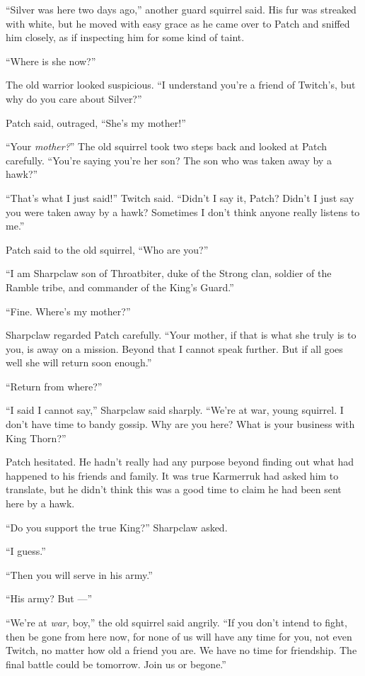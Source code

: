 \documentclass[12pt]{memoir}
\begin{document}
“Silver was here two days ago,” another guard squirrel said. His fur
was streaked with white, but he moved with easy grace as he came over
to Patch and sniffed him closely, as if inspecting him for some kind
of taint.

“Where is she now?”

The old warrior looked suspicious. “I understand you’re a friend of
Twitch’s, but why do you care about Silver?”

Patch said, outraged, “She’s my mother!”

“Your \textit{mother?}” The old squirrel took two steps back and
looked at Patch carefully. “You’re saying you’re her son? The son who
was taken away by a hawk?”

“That’s what I just said!” Twitch said. “Didn’t I say it, Patch?
Didn’t I just say you were taken away by a hawk? Sometimes I don’t
think anyone really listens to me.”

Patch said to the old squirrel, “Who are you?”

“I am Sharpclaw son of Throatbiter, duke of the Strong clan, soldier
of the Ramble tribe, and commander of the King’s Guard.”

“Fine. Where’s my mother?”

Sharpclaw regarded Patch carefully. “Your mother, if that is what she
truly is to you, is away on a mission. Beyond that I cannot speak
further. But if all goes well she will return soon enough.”

“Return from where?”

“I said I cannot say,” Sharpclaw said sharply. “We’re at war, young
squirrel. I don’t have time to bandy gossip. Why are you here? What is
your business with King Thorn?”

Patch hesitated. He hadn’t really had any purpose beyond finding out
what had happened to his friends and family. It was true Karmerruk had
asked him to translate, but he didn’t think this was a good time to
claim he had been sent here by a hawk.

“Do you support the true King?” Sharpclaw asked.

“I guess.”

“Then you will serve in his army.”

“His army? But —”

“We’re at \textit{war,} boy,” the old squirrel said angrily. “If you
don’t intend to fight, then be gone from here now, for none of us will
have any time for you, not even Twitch, no matter how old a friend you
are. We have no time for friendship. The final battle could be
tomorrow. Join us or begone.”
\end{document}
